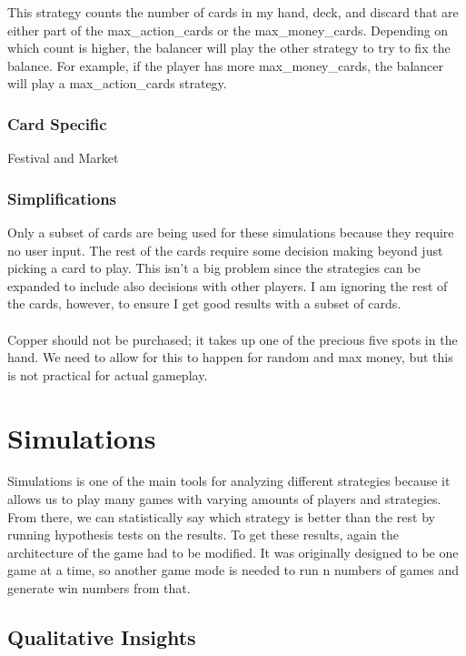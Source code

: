 \documentclass[11pt, oneside]{article}   	%
\begin{document}
This strategy counts the number of cards in my hand, deck, and discard that are either part of the max\_action\_cards or the max\_money\_cards. Depending on which count is higher, the balancer will play the other strategy to try to fix the balance. For example, if the player has more max\_money\_cards, the balancer will play a max\_action\_cards strategy. 

\subsubsection{Card Specific}

Festival and Market

\subsubsection{Simplifications}

Only a subset of cards are being used for these simulations because they require no user input. The rest of the cards require some decision making beyond just picking a card to play. This isn't a big problem since the strategies can be expanded to include also decisions with other players. I am ignoring the rest of the cards, however, to ensure I get good results with a subset of cards. \\
\\
Copper should not be purchased; it takes up one of the precious five spots in the hand. We need to allow for this to happen for random and max money, but this is not practical for actual gameplay.

\section{Simulations}

Simulations is one of the main tools for analyzing different strategies because it allows us to play many games with varying amounts of players and strategies. From there, we can statistically say which strategy is better than the rest by running hypothesis tests on the results. To get these results, again the architecture of the game had to be modified. It was originally designed to be one game at a time, so another game mode is needed to run n numbers of games and generate win numbers from that. 

\subsection{Qualitative Insights}
\end{document}
